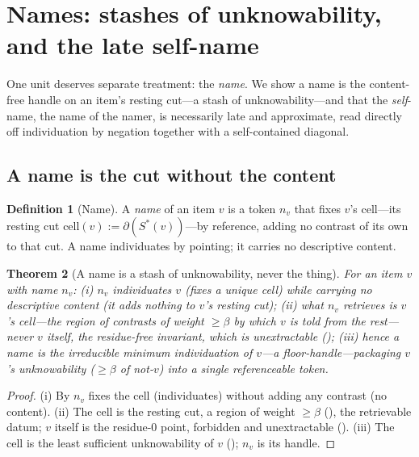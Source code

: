 \documentclass[twocolumn,11pt,a4paper]{article}
\theoremstyle{sup}
\newtheorem{theorem}{Theorem}[section]
\theoremstyle{definition}
\newtheorem{definition}[theorem]{Definition}
\theoremstyle{remark}
\newcommand{\flo}{\beta}
\newcommand{\cut}{\partial}
\begin{document}
\section{Names: stashes of unknowability, and the late self-name}
\label{sec:names}

One unit deserves separate treatment: the \emph{name}. We show a name is the
content-free handle on an item's resting cut---a stash of unknowability---and
that the \emph{self}-name, the name of the namer, is necessarily late and
approximate, read directly off individuation by negation together with a
self-contained diagonal.

\subsection{A name is the cut without the content}

\begin{definition}[Name]
\label{def:name}
A \emph{name} of an item $v$ is a token $n_v$ that fixes $v$'s cell---its resting
cut $\mathrm{cell}(v):=\cut(S^\ast(v))$---by reference, adding no contrast of its
own to that cut. A name individuates by pointing; it carries no descriptive
content.
\end{definition}

\begin{theorem}[A name is a stash of unknowability, never the thing]
\label{thm:name-stash}
For an item $v$ with name $n_v$: \textup{(i)} $n_v$ individuates $v$ (fixes a
unique cell) while carrying no descriptive content (it adds nothing to $v$'s
resting cut); \textup{(ii)} what $n_v$ retrieves is $v$'s cell---the region of
contrasts of weight $\ge\flo$ by which $v$ is told from the rest---never $v$
itself, the residue-free invariant, which is unextractable
(); \textup{(iii)} hence a name is the irreducible
minimum individuation of $v$---a floor-handle---packaging $v$'s unknowability
($\ge\flo$ of \emph{not}-$v$) into a single referenceable token.
\end{theorem}

\begin{proof}
(i) By  $n_v$ fixes the cell (individuates) without adding any
contrast (no content). (ii) The cell is the resting cut, a region of weight
$\ge\flo$ (), the retrievable datum; $v$ itself is the
residue-$0$ point, forbidden and unextractable
(). (iii) The cell is the least sufficient
unknowability of $v$ (); $n_v$ is its handle.
\end{proof}
\end{document}

